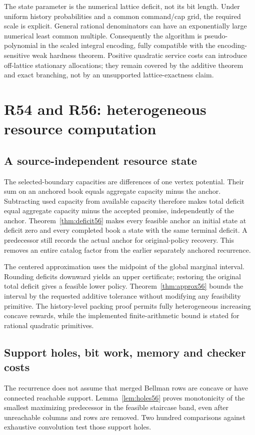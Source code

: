 The state parameter is the numerical lattice deficit, not its bit length. Under uniform history probabilities and a common command/cap grid, the required scale is explicit. General rational denominators can have an exponentially large numerical least common multiple. Consequently the algorithm is pseudo-polynomial in the scaled integral encoding, fully compatible with the encoding-sensitive weak hardness theorem. Positive quadratic service costs can introduce off-lattice stationary allocations; they remain covered by the additive theorem and exact branching, not by an unsupported lattice-exactness claim.

\section{R54 and R56: heterogeneous resource computation}
\subsection{A source-independent resource state}
The selected-boundary capacities are differences of one vertex potential. Their sum on an anchored book equals aggregate capacity minus the anchor. Subtracting used capacity from available capacity therefore makes total deficit equal aggregate capacity minus the accepted promise, independently of the anchor. Theorem~\ref{thm:deficit56} makes every feasible anchor an initial state at deficit zero and every completed book a state with the same terminal deficit. A predecessor still records the actual anchor for original-policy recovery. This removes an entire catalog factor from the earlier separately anchored recurrence.

The centered approximation uses the midpoint of the global marginal interval. Rounding deficits downward yields an upper certificate; restoring the original total deficit gives a feasible lower policy. Theorem~\ref{thm:approx56} bounds the interval by the requested additive tolerance without modifying any feasibility primitive. The history-level packing proof permits fully heterogeneous increasing concave rewards, while the implemented finite-arithmetic bound is stated for rational quadratic primitives.

\subsection{Support holes, bit work, memory and checker costs}
The recurrence does not assume that merged Bellman rows are concave or have connected reachable support. Lemma~\ref{lem:holes56} proves monotonicity of the smallest maximizing predecessor in the feasible staircase band, even after unreachable columns and rows are removed. Two hundred comparisons against exhaustive convolution test those support holes.

